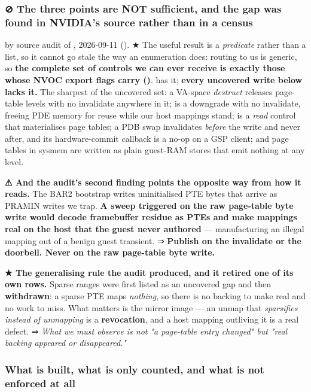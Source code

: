 \documentclass[10.5pt]{article}
\begin{document}
\subsubsection*{⊘ The three points are NOT sufficient, and the gap was found in NVIDIA's source rather than in a census}

\measured{} by source audit of , 2026-09-11
(). ★ The useful result is a
\emph{predicate} rather than a list, so it cannot go stale the way an enumeration does: routing to
us is generic, so \textbf{the complete set of controls we can ever receive is exactly those whose
NVOC export flags carry  ()}.
 has it; \textbf{every uncovered write below lacks it.} The sharpest of
the uncovered set: a VA-space \emph{destruct} releases page-table levels with no invalidate
anywhere in it;  is a downgrade with no invalidate, freeing PDE
memory for reuse while our host mappings stand;  is a \emph{read}
control that materialises page tables; a PDB swap invalidates \emph{before} the write and never
after, and its hardware-commit callback is a no-op on a GSP client; and page tables in sysmem are
written as plain guest-RAM stores that emit nothing at any level.

\textbf{⚠ And the audit's second finding points the opposite way from how it reads.} The BAR2
bootstrap writes uninitialised PTE bytes that arrive as PRAMIN writes we trap. \textbf{A sweep
triggered on the raw page-table byte write would decode framebuffer residue as PTEs and make
mappings real on the host that the guest never authored} --- manufacturing an illegal mapping out
of a benign guest transient. ⇒ \textbf{Publish on the invalidate or the doorbell. Never on the raw
page-table byte write.}

\textbf{★ The generalising rule the audit produced, and it retired one of its own rows.} Sparse
ranges were first listed as an uncovered gap and then \textbf{withdrawn}: a sparse PTE maps
\emph{nothing}, so there is no backing to make real and no work to miss. What matters is the
mirror image --- an unmap that \emph{sparsifies instead of unmapping} is a \textbf{revocation},
and a host mapping outliving it is a real defect. ⇒ \emph{What we must observe is not "a
page-table entry changed" but "real backing appeared or disappeared."}

\subsubsection*{What is built, what is only counted, and what is not enforced at all}
\end{document}
